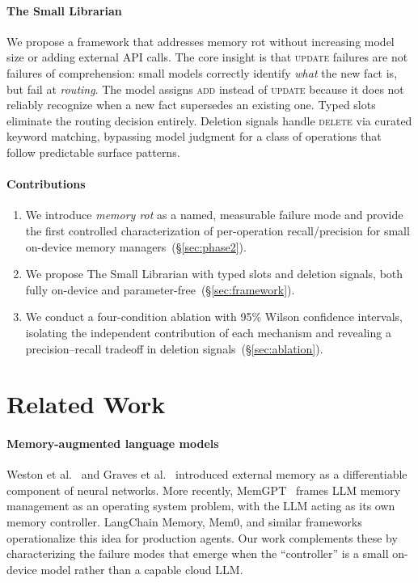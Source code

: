 \documentclass[10pt, twocolumn]{article}
\begin{document}
\paragraph{The Small Librarian}
We propose a framework that addresses memory rot without increasing model
size or adding external API calls.
The core insight is that \textsc{update} failures are not failures of
comprehension: small models correctly identify \emph{what} the new fact
is, but fail at \emph{routing}. The model assigns \textsc{add} instead
of \textsc{update} because it does not reliably recognize when a new fact
supersedes an existing one.
Typed slots eliminate the routing decision entirely.
Deletion signals handle \textsc{delete} via curated keyword matching,
bypassing model judgment for a class of operations that follow predictable
surface patterns.

\paragraph{Contributions}
\begin{enumerate}[leftmargin=*, itemsep=1pt, topsep=2pt]
  \item We introduce \emph{memory rot} as a named, measurable failure mode
    and provide the first controlled characterization of per-operation
    recall/precision for small on-device memory managers~(\S\ref{sec:phase2}).
  \item We propose The Small Librarian with typed slots and deletion signals,
    both fully on-device and parameter-free~(\S\ref{sec:framework}).
  \item We conduct a four-condition ablation with 95\% Wilson confidence
    intervals, isolating the independent contribution of each mechanism and
    revealing a precision--recall tradeoff in deletion signals~(\S\ref{sec:ablation}).
\end{enumerate}

\section{Related Work}
\label{sec:related}

\paragraph{Memory-augmented language models}
Weston et al.~\cite{weston2014memory} and Graves et al.~\cite{graves2014neural}
introduced external memory as a differentiable component of neural networks.
More recently, MemGPT~\cite{packer2023memgpt} frames LLM memory management
as an operating system problem, with the LLM acting as its own memory
controller.
LangChain Memory, Mem0, and similar frameworks operationalize this idea for
production agents.
Our work complements these by characterizing the failure modes that emerge
when the ``controller'' is a small on-device model rather than a capable
cloud LLM.
\end{document}
